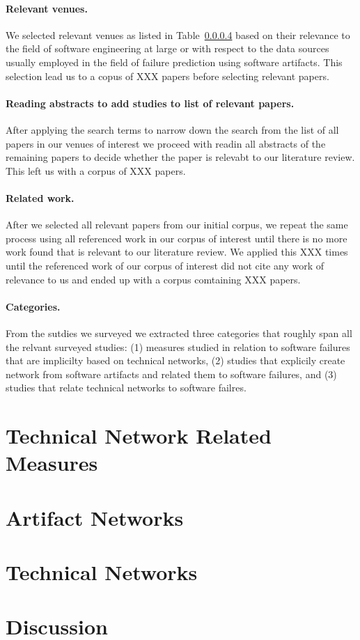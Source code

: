 \paragraph{Relevant venues.} We selected relevant venues as listed in Table~\ref{} based on their relevance to the field of software engineering at large or with respect to the data sources usually employed in the field of failure prediction using software artifacts.
This selection lead us to a copus of XXX papers before selecting relevant papers.

\paragraph{Reading abstracts to add studies to list of relevant papers.} After applying the search terms to narrow down the search from the list of all papers in our venues of interest we proceed with readin all abstracts of the remaining papers to decide whether the paper is relevabt to our literature review.
This left us with a corpus of XXX papers.

\paragraph{Related work.} After we selected all relevant papers from our initial corpus, we repeat the same process using all referenced work in our corpus of interest until there is no more work found that is relevant to our literature review.
We applied this XXX times until the referenced work of our corpus of interest did not cite any work of relevance to us and ended up with a corpus comtaining XXX papers.

\paragraph{Categories.} From the sutdies we surveyed we extracted three categories that roughly span all the relvant surveyed studies:
(1) measures studied in relation to software failures that are implicilty based on technical networks,
(2) studies that explicily create network from software artifacts and related them to software failures,
and (3) studies that relate technical networks to software failres.

\section{Technical Network Related Measures}
\label{chap:6:measure}
\section{Artifact Networks}
\label{chap:6:an}
\section{Technical Networks}
\label{chap:6:tn}
\section{Discussion}
\label{chap:6:dis}
